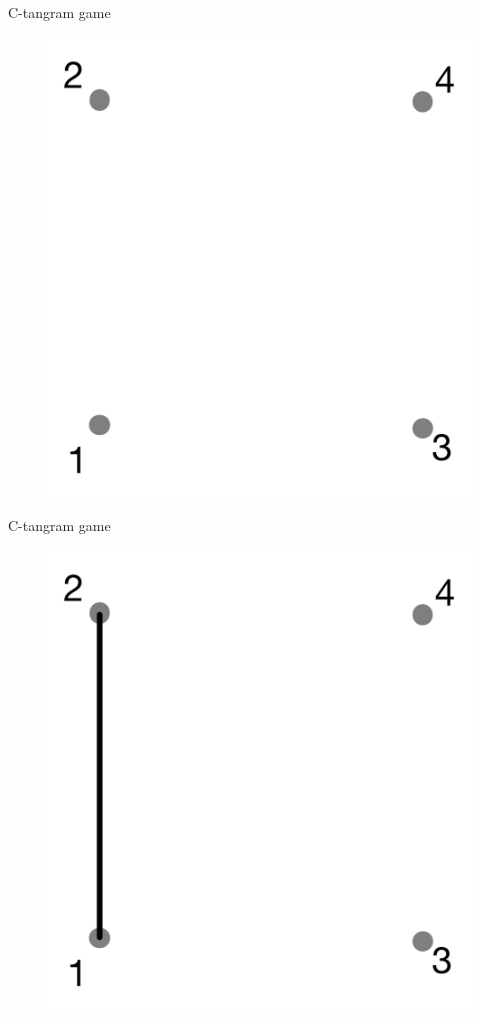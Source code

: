 \documentclass{beamer}
\begin{document}
\begin{frame}{C-tangram game}
    \begin{figure}
        \centering
        \includegraphics[scale=0.16]{images/0-skeleton.png}
    \end{figure}
\end{frame}

\begin{frame}{C-tangram game}
    \begin{figure}
        \centering
        \includegraphics[scale=0.16]{images/Step1.png}
    \end{figure}
\end{frame}
\end{document}
